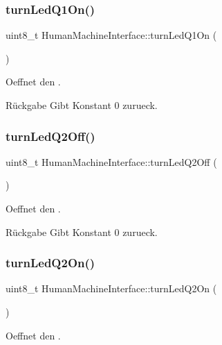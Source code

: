 \subsubsection{\texorpdfstring{turn\+Led\+Q1\+On()}{turnLedQ1On()}}
{\footnotesize\ttfamily uint8\+\_\+t Human\+Machine\+Interface\+::turn\+Led\+Q1\+On (\begin{DoxyParamCaption}{ }\end{DoxyParamCaption})}

Oeffnet den .

\begin{DoxyReturn}{Rückgabe}
Gibt Konstant 0 zurueck. 
\end{DoxyReturn}
\hypertarget{class_human_machine_interface_a73d76c6dd54b115fa8df9cf5f2b0d2aa}{}\label{class_human_machine_interface_a73d76c6dd54b115fa8df9cf5f2b0d2aa} 
\subsubsection{\texorpdfstring{turn\+Led\+Q2\+Off()}{turnLedQ2Off()}}
{\footnotesize\ttfamily uint8\+\_\+t Human\+Machine\+Interface\+::turn\+Led\+Q2\+Off (\begin{DoxyParamCaption}{ }\end{DoxyParamCaption})}

Oeffnet den .

\begin{DoxyReturn}{Rückgabe}
Gibt Konstant 0 zurueck. 
\end{DoxyReturn}
\hypertarget{class_human_machine_interface_a9fcfd97db711e6954cbfeec8f93efb58}{}\label{class_human_machine_interface_a9fcfd97db711e6954cbfeec8f93efb58} 
\subsubsection{\texorpdfstring{turn\+Led\+Q2\+On()}{turnLedQ2On()}}
{\footnotesize\ttfamily uint8\+\_\+t Human\+Machine\+Interface\+::turn\+Led\+Q2\+On (\begin{DoxyParamCaption}{ }\end{DoxyParamCaption})}

Oeffnet den .

